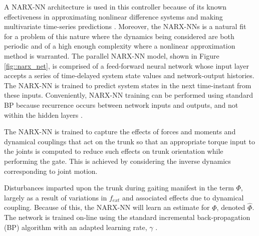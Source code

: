 
A NARX-NN architecture is used in this controller because of  its known effectiveness in approximating nonlinear difference systems and 
making multivariate time-series predictions \cite{Tsungnan1996,ChenBillings1990,Hihi1996,Billings2013}. 
Moreover, the NARX-NNs is a natural fit for a problem of this nature where the dynamics being considered are both periodic and of a 
high enough complexity where a nonlinear approximation method is warranted.
The parallel NARX-NN model, shown in Figure \ref{fig::narx_net}, is comprised of a feed-forward neural network whose input
layer accepts a series of time-delayed system state values and network-output histories. The NARX-NN is trained to predict 
system states in the next time-instant from these inputs. Conveniently, NARX-NN training can be performed 
using standard BP because recurrence occurs between network inputs and outputs, and not within the hidden layers 
\cite{Nelles2001}.

The NARX-NN is trained to capture the effects of forces and moments and dynamical couplings that act on the trunk
so that an appropriate torque input to the joints is computed to reduce such effects on trunk orientation while performing
the gate. This is achieved by considering the inverse dynamics corresponding to joint motion.

Disturbances imparted upon the trunk during gaiting manifest in the term $\Phi$, largely as a result of variations in $f_{ext}$ and associated effects due to dynamical coupling. 
Because of this, the NARX-NN will learn an estimate for $\Phi$, denoted $\hat{\Phi}$. The network is trained on-line using the standard incremental back-propagation 
(BP) algorithm with an adapted learning rate, $\gamma$ \cite{Rumelhart1988,Rumelhart1995}.

